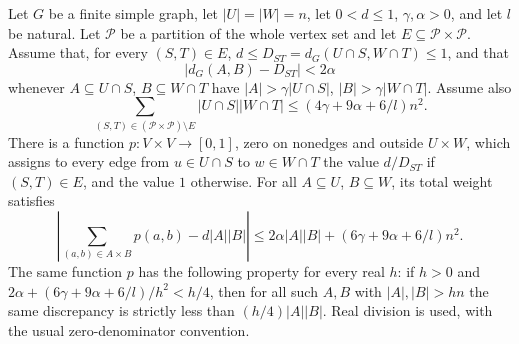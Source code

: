 \begin{lemma}
Let $G$ be a finite simple graph, let $|U|=|W|=n$, let
$0<d\leq1$, $\gamma,\alpha>0$, and let $l$ be natural.
Let $\mathcal P$ be a partition of the whole vertex set and let
$E\subseteq\mathcal P\times\mathcal P$. Assume that, for every
$(S,T)\in E$, $d\leq D_{ST}=d_G(U\cap S,W\cap T)\leq1$, and that
\[
 |d_G(A,B)-D_{ST}|<2\alpha
\]
whenever $A\subseteq U\cap S$, $B\subseteq W\cap T$ have
$|A|>\gamma|U\cap S|$, $|B|>\gamma|W\cap T|$.
Assume also
\[
 \sum_{(S,T)\in(\mathcal P\times\mathcal P)\setminus E}
 |U\cap S||W\cap T|\leq(4\gamma+9\alpha+6/l)n^2.
\]
There is a function $p:V\times V\to[0,1]$, zero on nonedges and
outside $U\times W$, which assigns to every edge from
$u\in U\cap S$ to $w\in W\cap T$ the value $d/D_{ST}$ if
$(S,T)\in E$, and the value $1$ otherwise. For all $A\subseteq U$,
$B\subseteq W$, its total weight satisfies
\[
 \left|\sum_{(a,b)\in A\times B}p(a,b)-d|A||B|\right|
 \leq2\alpha|A||B|+(6\gamma+9\alpha+6/l)n^2.
\]
The same function $p$ has the following property for every real $h$:
if $h>0$ and $2\alpha+(6\gamma+9\alpha+6/l)/h^2<h/4$, then
for all such $A,B$ with $|A|,|B|>hn$ the same discrepancy is
strictly less than $(h/4)|A||B|$. Real division is used, with the usual
zero-denominator convention.
\end{lemma}
